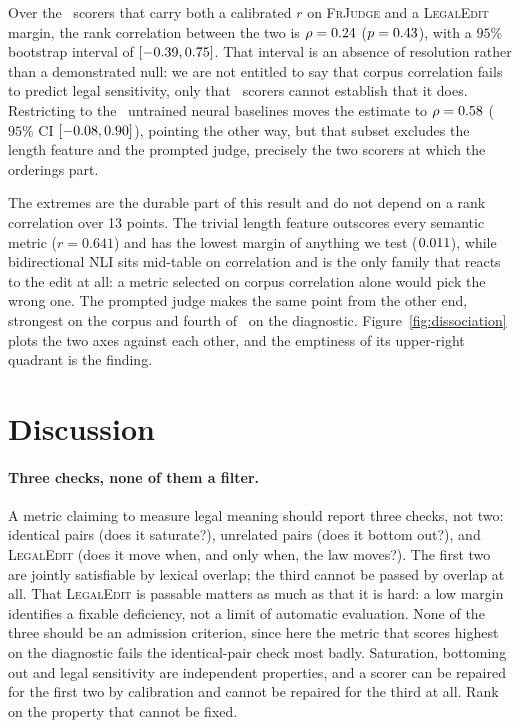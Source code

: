 \documentclass[11pt]{article}
\begin{document}
Over the \nDissocAll\ scorers that carry both a calibrated $r$ on
\textsc{FrJudge} and a \textsc{LegalEdit} margin, the rank correlation between
the two is $\rho=0.24$ ($p=0.43$), with a $95\%$ bootstrap
interval of $[-0.39, 0.75]$. That interval is an absence of
resolution rather than a demonstrated null: we are not entitled to say that
corpus correlation fails to predict legal sensitivity, only that \nDissocAll\
scorers cannot establish that it does. Restricting to the \nDissoc\ untrained
neural baselines moves the estimate to $\rho=0.58$ ($95\%$ CI
$[-0.08, 0.90]$), pointing the other way, but that subset
excludes the length feature and the prompted judge, precisely the two scorers at
which the orderings part.

The extremes are the durable part of this result and do not depend on a rank
correlation over 13 points. The trivial length feature outscores every
semantic metric ($r=0.641$) and has the lowest margin of anything we test
($0.011$), while bidirectional NLI sits mid-table on
correlation and is the only family that reacts to the edit at all: a metric
selected on corpus correlation alone would pick the wrong one. The prompted
judge makes the same point from the other end, strongest on the corpus and
fourth of \nMetricsChallenged\ on the diagnostic. Figure~\ref{fig:dissociation}
plots the two axes against each other, and the emptiness of its upper-right
quadrant is the finding.


\section{Discussion}
\label{sec:discussion}

\paragraph{Three checks, none of them a filter.}
A metric claiming to measure legal meaning should report three checks, not two:
identical pairs (does it saturate?), unrelated pairs (does it bottom out?), and
\textsc{LegalEdit} (does it move when, and only when, the law moves?). The first
two are jointly satisfiable by lexical overlap; the third cannot be passed by
overlap at all. That \textsc{LegalEdit} is passable matters as much as that it
is hard: a low margin identifies a fixable deficiency, not a limit of automatic
evaluation. None of the three should be an admission criterion, since here the
metric that scores highest on the diagnostic fails the identical-pair check most
badly. Saturation, bottoming out and legal sensitivity are independent
properties, and a scorer can be repaired for the first two by calibration and
cannot be repaired for the third at all. Rank on the property that cannot be
fixed.
\end{document}
